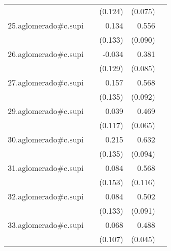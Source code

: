 {\begin{longtable}{l*{4}{D{.}{.}{-1}}}
            &                     &     (0.124)         &     (0.075)         &                     \\
\addlinespace
25.aglomerado#c.supi&                     &       0.134         &       0.556\sym{***}&                     \\
            &                     &     (0.133)         &     (0.090)         &                     \\
\addlinespace
26.aglomerado#c.supi&                     &      -0.034         &       0.381\sym{***}&                     \\
            &                     &     (0.129)         &     (0.085)         &                     \\
\addlinespace
27.aglomerado#c.supi&                     &       0.157         &       0.568\sym{***}&                     \\
            &                     &     (0.135)         &     (0.092)         &                     \\
\addlinespace
29.aglomerado#c.supi&                     &       0.039         &       0.469\sym{***}&                     \\
            &                     &     (0.117)         &     (0.065)         &                     \\
\addlinespace
30.aglomerado#c.supi&                     &       0.215         &       0.632\sym{***}&                     \\
            &                     &     (0.135)         &     (0.094)         &                     \\
\addlinespace
31.aglomerado#c.supi&                     &       0.084         &       0.568\sym{***}&                     \\
            &                     &     (0.153)         &     (0.116)         &                     \\
\addlinespace
32.aglomerado#c.supi&                     &       0.084         &       0.502\sym{***}&                     \\
            &                     &     (0.133)         &     (0.091)         &                     \\
\addlinespace
33.aglomerado#c.supi&                     &       0.068         &       0.488\sym{***}&                     \\
            &                     &     (0.107)         &     (0.045)         &                     \\

\end{longtable}}
